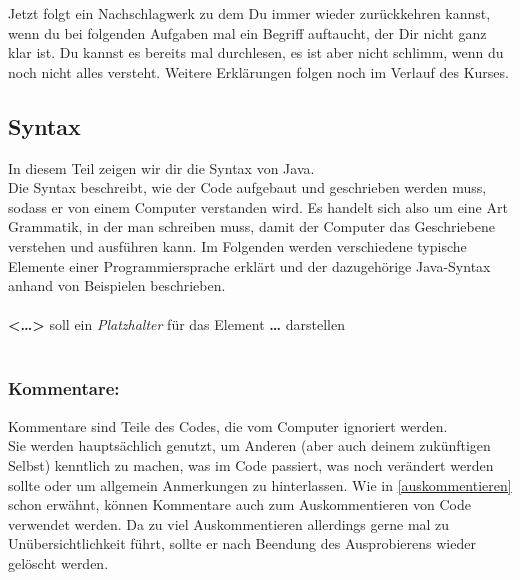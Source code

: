 

\label{ex2}

Jetzt folgt ein Nachschlagwerk zu dem Du immer wieder zurückkehren kannst, wenn du bei folgenden Aufgaben mal ein Begriff auftaucht, der Dir nicht ganz klar ist.\newline
Du kannst es bereits mal durchlesen, es ist aber nicht schlimm, wenn du noch nicht alles versteht. Weitere Erklärungen folgen noch im Verlauf des Kurses.\\

\subsection*{Syntax}
\noindent
In diesem Teil zeigen wir dir die Syntax von Java.\\
Die Syntax beschreibt, wie der Code aufgebaut und geschrieben werden muss, sodass er von einem Computer verstanden wird. Es handelt sich also um eine Art Grammatik, in der man schreiben muss, damit der Computer das Geschriebene verstehen und ausführen kann.\newline
Im Folgenden werden verschiedene typische Elemente einer Programmiersprache erklärt und der dazugehörige Java-Syntax anhand von Beispielen beschrieben.\\\\
\hspace*{\fill}\textbf{<\dots>} soll ein \textit{Platzhalter} für das Element \textbf{\dots} darstellen\hspace*{\fill}\\\\

\begin{Infobox}
	\subsubsection*{Kommentare:}
	Kommentare sind Teile des Codes, die vom Computer ignoriert werden.\\
	Sie werden hauptsächlich genutzt, um Anderen (aber auch deinem zukünftigen Selbst) kenntlich zu machen, was im Code passiert, was noch verändert werden sollte oder um allgemein Anmerkungen zu hinterlassen.\newline
	Wie in \ref{auskommentieren} schon erwähnt, können Kommentare auch zum Auskommentieren von Code verwendet werden. Da zu viel Auskommentieren allerdings gerne mal zu Unübersichtlichkeit führt, sollte er nach Beendung des Ausprobierens wieder gelöscht werden.
\end{Infobox}

